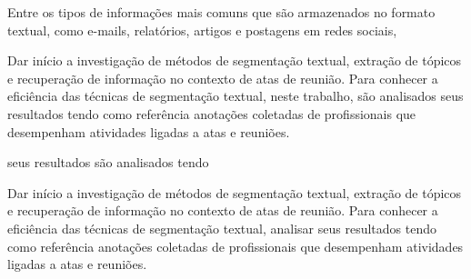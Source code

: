 Entre os tipos de informações mais comuns que são armazenados no formato textual, como e-mails, relatórios, artigos e postagens em redes sociais,





















































Dar início a investigação de métodos de segmentação textual, extração de tópicos e recuperação de informação no contexto de atas de reunião. Para conhecer a eficiência das técnicas de segmentação textual, neste trabalho, são analisados seus resultados tendo como referência anotações coletadas de profissionais que desempenham atividades ligadas a atas e reuniões.


seus resultados são analisados tendo 





Dar início a investigação de métodos de segmentação textual, extração de tópicos e recuperação de informação no contexto de atas de reunião. Para conhecer a eficiência das técnicas de segmentação textual, analisar seus resultados tendo como referência anotações coletadas de profissionais que desempenham atividades ligadas a atas e reuniões.







%
















